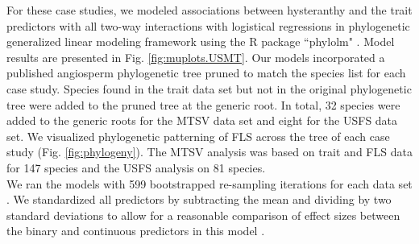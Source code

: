 \documentclass[11pt]{article}
\begin{document}
  \noindent For these case studies, we modeled associations between hysteranthy and the trait predictors with all two-way interactions with logistical regressions in phylogenetic generalized linear modeling framework \citep{Ives2010} using the R package ``phylolm" \citep{Ho2014}. Model results are presented in Fig. \ref{fig:muplots.USMT}. Our models incorporated a published angiosperm phylogenetic tree \citep{Zanne2013} pruned to match the species list for each case study. Species found in the trait data set but not in the original phylogenetic tree were added to the pruned tree at the generic root. In total, 32 species were added to the generic roots for the MTSV data set and eight for the USFS data set. We visualized phylogenetic patterning of FLS across the tree of each case study (Fig. \ref{fig:phylogeny}). The MTSV analysis was based on trait and FLS data for 147 species and the USFS analysis on 81 species. \\
  
  \noindent We ran the models with 599 bootstrapped re-sampling iterations for each data set \citep{Wilcox2010}. We standardized all predictors by subtracting the mean and dividing by two standard deviations to allow for a reasonable comparison of effect sizes between the binary and continuous predictors in this model \citep{Gelman2007}. 
  
  
\end{document}
